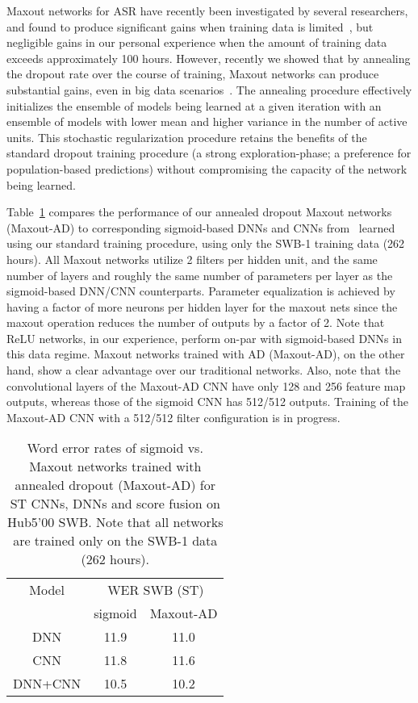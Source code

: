 \documentclass[a4paper]{article}
\begin{document}
Maxout networks for ASR have recently been investigated by several
researchers, and found to produce significant gains when training data
is limited~\cite{zhang14}, but negligible gains in our personal
experience when the amount of training data exceeds approximately 100
hours. However, recently we showed that by annealing the dropout rate
over the course of training, Maxout networks can produce substantial
gains, even in big data scenarios~\cite{rennie14}. The annealing
procedure effectively initializes the ensemble of models being learned
at a given iteration with an ensemble of models with lower mean and
higher variance in the number of active units. This stochastic
regularization procedure retains the benefits of the standard dropout
training procedure (a strong exploration-phase; a preference for
population-based predictions) without compromising the capacity of the
network being learned.

Table~\ref{maxout-tab} compares the performance of our annealed
dropout Maxout networks (Maxout-AD) to corresponding sigmoid-based
DNNs and CNNs from~\cite{soltau14} learned using our standard training
procedure, using only the SWB-1 training data (262 hours). All Maxout
networks utilize 2 filters per hidden unit, and the same number of
layers and roughly the same number of parameters per layer as the
sigmoid-based DNN/CNN counterparts. Parameter equalization is achieved
by having a factor of  more neurons per hidden layer for the
maxout nets since the maxout operation reduces the number of outputs
by a factor of 2. Note that ReLU networks, in our experience, perform
on-par with sigmoid-based DNNs in this data regime. Maxout networks
trained with AD (Maxout-AD), on the other hand, show a clear advantage
over our traditional networks. Also, note that the convolutional layers of the Maxout-AD CNN have only 128 and 256 feature map outputs, whereas those of the sigmoid CNN has 512/512 outputs. Training of the Maxout-AD CNN with a 512/512 filter configuration is in progress.

\begin{table}[htpb!]
\begin{center}
\begin{tabular}{|c|c|c|} \hline
Model   & \multicolumn{2}{|c|}{WER SWB (ST)}\\ \cline{2-3}
        & sigmoid & Maxout-AD\\ \hline
DNN     & 11.9     & 11.0     \\ \hline
CNN     & 11.8     & 11.6     \\ \hline
DNN+CNN & 10.5     & 10.2     \\ \hline
\end{tabular}
\end{center}
\caption{\label{maxout-tab}
Word error rates of sigmoid vs. Maxout networks trained with
annealed dropout (Maxout-AD) for ST CNNs, DNNs and score fusion on Hub5'00 SWB. Note that all networks are trained only on the SWB-1 data (262 hours). }
\end{table}
\end{document}
